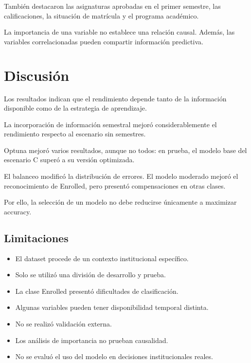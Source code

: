 \documentclass[11pt,a4paper]{article}
\begin{document}
También destacaron las asignaturas aprobadas
en el primer semestre, las calificaciones,
la situación de matrícula y el programa académico.

La importancia de una variable no establece
una relación causal. Además, las variables
correlacionadas pueden compartir información
predictiva.

\section{Discusión}

Los resultados indican que el rendimiento
depende tanto de la información disponible
como de la estrategia de aprendizaje.

La incorporación de información semestral
mejoró considerablemente el rendimiento
respecto al escenario sin semestres.

Optuna mejoró varios resultados, aunque
no todos: en prueba, el modelo base del
escenario C superó a su versión optimizada.

El balanceo modificó la distribución de
errores. El modelo moderado mejoró el
reconocimiento de Enrolled, pero presentó
compensaciones en otras clases.

Por ello, la selección de un modelo no debe
reducirse únicamente a maximizar accuracy.

\subsection{Limitaciones}

\begin{itemize}
\item El dataset procede de un contexto institucional específico.
\item Solo se utilizó una división de desarrollo y prueba.
\item La clase Enrolled presentó dificultades de clasificación.
\item Algunas variables pueden tener disponibilidad temporal distinta.
\item No se realizó validación externa.
\item Los análisis de importancia no prueban causalidad.
\item No se evaluó el uso del modelo en decisiones institucionales reales.
\end{itemize}

\end{document}

